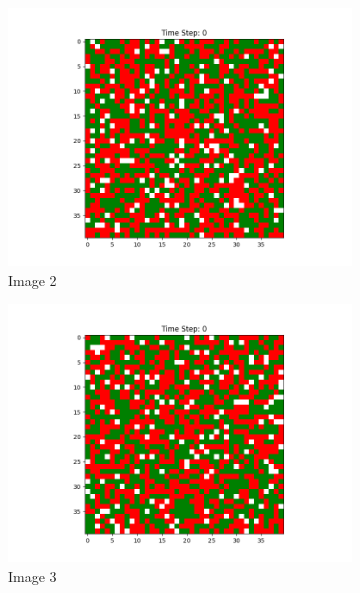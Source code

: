\documentclass[12pt]{article}
\begin{document}
\begin{figure}[h]
		\begin{subfigure}{0.2\textwidth}
			\includegraphics[width=\linewidth]{initial_cluster_w5b10.png}
			\caption{Image 2}
		\end{subfigure}\hspace{0.02\textwidth}
		\begin{subfigure}{0.2\textwidth}
			\includegraphics[width=\linewidth]{initial_cluster_w10b10.png}				
			\caption{Image 3}
		\end{subfigure}\hspace{0.02\textwidth}
		\begin{subfigure}{0.2\textwidth}

\end{subfigure}
\end{figure}
\end{document}
